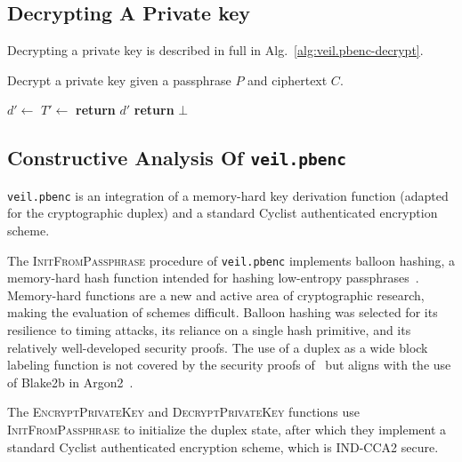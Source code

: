 \subsection{Decrypting A Private key}\label{subsec:veil.pbenc-decrypt}

Decrypting a private key is described in full in Alg.~\ref{alg:veil.pbenc-decrypt}\@.

\begin{algorithm}
    \caption{
        Decrypt a private key given a passphrase $P$ and ciphertext $C$.
    }
    \begin{algorithmic}
        \State {}
        \State $d' \gets$
        \State $T' \gets$
        \State \textbf{return} $d'$
        \Else
        \State \textbf{return} $\bot$
        \EndIf
        \EndFunction
    \end{algorithmic}\label{alg:veil.pbenc-decrypt}
\end{algorithm}

\subsection{Constructive Analysis Of \texttt{veil.pbenc}}\label{subsec:veil.pbenc-analysis}

\texttt{veil.pbenc} is an integration of a memory-hard key derivation function \@(adapted for the
cryptographic duplex) and a standard Cyclist authenticated encryption scheme.

The \textsc{InitFromPassphrase} procedure of \texttt{veil.pbenc} implements balloon hashing, a
memory-hard hash function intended for hashing low-entropy passphrases~\cite{boneh2016}. Memory-hard
functions are a new and active area of cryptographic research, making the evaluation of schemes
difficult. Balloon hashing was selected for its resilience to timing attacks, its reliance on a
single hash primitive, and its relatively well-developed security proofs. The use of a duplex as a
wide block labeling function is not covered by the security proofs
of~\cite[Appendix~B.3]{boneh2016} but aligns with the use of Blake2b in Argon2~\cite{rfc9106}.

The \textsc{EncryptPrivateKey} and \textsc{DecryptPrivateKey} functions use
\textsc{InitFromPassphrase} to initialize the duplex state, after which they implement a standard
Cyclist authenticated encryption scheme, which is IND-CCA2 secure.

